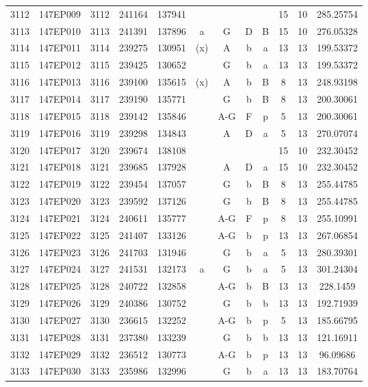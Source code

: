 \begin{tabular}{|*{12}{c|}}
3112 & 147EP009 & 3112 & 241164 & 137941 &  &  &  &  & 15 & 10 & 285.25754 \\ 
3113 & 147EP010 & 3113 & 241391 & 137896 & a & G & D & B & 15 & 10 & 276.05328 \\ 
3114 & 147EP011 & 3114 & 239275 & 130951 & (x) & A & b & a & 13 & 13 & 199.53372 \\ 
3115 & 147EP012 & 3115 & 239425 & 130652 &  & G & b & a & 13 & 13 & 199.53372 \\ 
3116 & 147EP013 & 3116 & 239100 & 135615 & (x) & A & b & B & 8 & 13 & 248.93198 \\ 
3117 & 147EP014 & 3117 & 239190 & 135771 &  & G & b & B & 8 & 13 & 200.30061 \\ 
3118 & 147EP015 & 3118 & 239142 & 135846 &  & A-G & F & p & 5 & 13 & 200.30061 \\ 
3119 & 147EP016 & 3119 & 239298 & 134843 &  & A & D & a & 5 & 13 & 270.07074 \\ 
3120 & 147EP017 & 3120 & 239674 & 138108 &  &  &  &  & 15 & 10 & 232.30452 \\ 
3121 & 147EP018 & 3121 & 239685 & 137928 &  & A & D & a & 15 & 10 & 232.30452 \\ 
3122 & 147EP019 & 3122 & 239454 & 137057 &  & G & b & B & 8 & 13 & 255.44785 \\ 
3123 & 147EP020 & 3123 & 239592 & 137126 &  & G & b & B & 8 & 13 & 255.44785 \\ 
3124 & 147EP021 & 3124 & 240611 & 135777 &  & A-G & F & p & 8 & 13 & 255.10991 \\ 
3125 & 147EP022 & 3125 & 241407 & 133126 &  & A-G & b & p & 13 & 13 & 267.06854 \\ 
3126 & 147EP023 & 3126 & 241703 & 131946 &  & G & b & a & 5 & 13 & 280.39301 \\ 
3127 & 147EP024 & 3127 & 241531 & 132173 & a & G & b & a & 5 & 13 & 301.24304 \\ 
3128 & 147EP025 & 3128 & 240722 & 132858 &  & A-G & b & B & 13 & 13 & 228.1459 \\ 
3129 & 147EP026 & 3129 & 240386 & 130752 &  & G & b & b & 13 & 13 & 192.71939 \\ 
3130 & 147EP027 & 3130 & 236615 & 132252 &  & A-G & b & p & 5 & 13 & 185.66795 \\ 
3131 & 147EP028 & 3131 & 237380 & 133239 &  & G & b & b & 13 & 13 & 121.16911 \\ 
3132 & 147EP029 & 3132 & 236512 & 130773 &  & A-G & b & p & 13 & 13 & 96.09686 \\ 
3133 & 147EP030 & 3133 & 235986 & 132996 &  & G & b & a & 13 & 13 & 183.70764 \\ 

\end{tabular}
